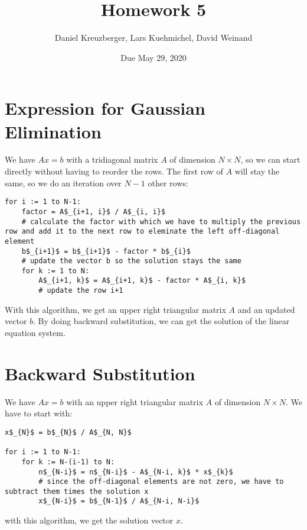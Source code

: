 \documentclass[11pt, a4paper]{article}
\title{Homework 5}
\date{Due May 29, 2020}
\author{Daniel Kreuzberger, Lars Kuehmichel, David Weinand}
\begin{document}
\maketitle
\section{Expression for Gaussian Elimination}
We have $Ax = b$ with a tridiagonal matrix $A$ of dimension $N \times N$, so we can start directly without having to reorder the rows. The first row of $A$ will stay the same, so we do an iteration over $N-1$ other rows:

\begin{lstlisting}
for i := 1 to N-1:
    factor = A$_{i+1, i}$ / A$_{i, i}$
    # calculate the factor with which we have to multiply the previous row and add it to the next row to eleminate the left off-diagonal element
    b$_{i+1}$ = b$_{i+1}$ - factor * b$_{i}$
    # update the vector b so the solution stays the same
    for k := 1 to N:
        A$_{i+1, k}$ = A$_{i+1, k}$ - factor * A$_{i, k}$
        # update the row i+1
\end{lstlisting}

With this algorithm, we get an upper right triangular matrix $A$ and an updated vector $b$. By doing backward substitution, we can get the solution of the linear equation system.
\newpage
\section{Backward Substitution}
We have $Ax = b$ with an upper right triangular matrix $A$ of dimension $N \times N$. We have to start with:
\begin{lstlisting}
x$_{N}$ = b$_{N}$ / A$_{N, N}$

for i := 1 to N-1:
    for k := N-(i-1) to N:
        n$_{N-i}$ = n$_{N-i}$ - A$_{N-i, k}$ * x$_{k}$
        # since the off-diagonal elements are not zero, we have to subtract them times the solution x
        x$_{N-i}$ = b$_{N-1}$ / A$_{N-i, N-i}$
\end{lstlisting}

with this algorithm, we get the solution vector $x$.
\end{document}
